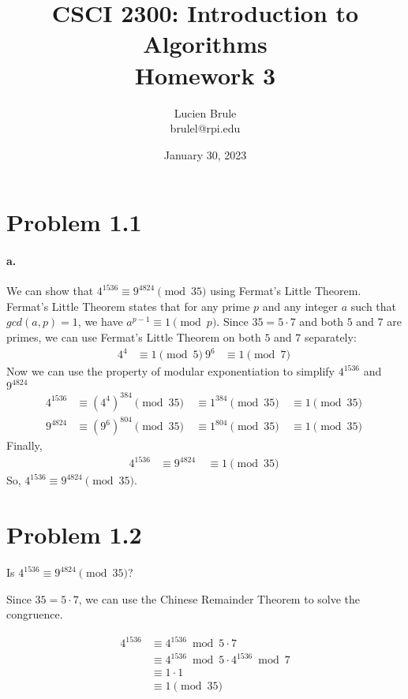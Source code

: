 \documentclass[11pt]{article}
\title{CSCI 2300: Introduction to Algorithms \\
\textbf{Homework 3}}
\author{Lucien Brule \\
brulel@rpi.edu}
\date{January 30, 2023}
\begin{document}
\maketitle

\section{Problem 1.1}
\paragraph*{a.}
We can show that $4^{1536} \equiv 9^{4824} \pmod{35}$ using Fermat's Little Theorem.
Fermat's Little Theorem states that for any prime $p$ and any integer $a$ such that $gcd(a,p)=1$, we have $a^{p-1} \equiv 1 \pmod{p}$.
Since $35 = 5 \cdot 7$ and both $5$ and $7$ are primes, we can use Fermat's Little Theorem on both $5$ and $7$ separately:
\begin{align*}
4^{4} &\equiv 1 \pmod 5 \
9^{6} &\equiv 1 \pmod 7 \
\end{align*}
Now we can use the property of modular exponentiation
\newline to simplify $4^{1536}$ and $9^{4824}$
\begin{align*}
4^{1536} &\equiv (4^{4})^{384} \pmod{35} \
&\equiv 1^{384} \pmod{35} \
&\equiv 1 \pmod{35} \
\end{align*}
\begin{align*}
9^{4824} &\equiv (9^{6})^{804} \pmod{35} \
&\equiv 1^{804} \pmod{35} \
&\equiv 1 \pmod{35} \
\end{align*}
Finally,
\begin{align*}
4^{1536} &\equiv 9^{4824} \
&\equiv 1 \pmod {35} \
\end{align*}
So, $4^{1536} \equiv 9^{4824} \pmod{35}$.

\pagebreak

\section*{Problem 1.2}


Is $4^{1536} \equiv 9^{4824} \pmod{35}$?

Since $35=5\cdot7$, we can use the Chinese Remainder Theorem to solve the congruence.

\begin{align*}
4^{1536} &\equiv 4^{1536}\bmod 5\cdot7 \\
&\equiv 4^{1536}\bmod 5 \cdot 4^{1536}\bmod 7 \\
&\equiv 1 \cdot 1 \\
&\equiv 1 \pmod{35} \\
\end{align*}
\end{document}
